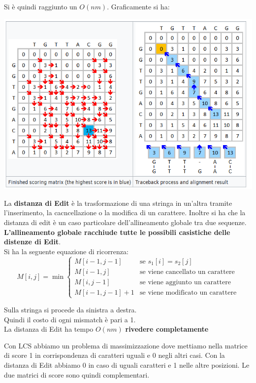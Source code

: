 \documentclass[a4paper,12pt, oneside]{book}
\begin{document}
Si è quindi raggiunto un $O(nm)$.
\newpage
Graficamente si ha:
\begin{center}
  \includegraphics[scale = 0.5]{img/sw.png}
\end{center}
\begin{definizione}
  La \textbf{distanza di Edit} è la trasformazione di una stringa in
  un'altra tramite l'inserimento, la cacncellazione o la modifica di
  un carattere. Inoltre si ha che la distanza di edit è un caso
  particolare dell'allineamento globale tra due sequenze.\\
  \textbf{L'allineamento globale racchiude tutte le possibili
    casistiche delle distenze di Edit}.\\
  Si ha la seguente equazione di ricorrenza:
  \[M[i,j]=\min
    \begin{cases}
      M[i-1,j-1] & \mbox{se } s_1[i]=s_2[j]\\
      M[i-1,j] & \mbox{se viene cancellato un carattere}\\
      M[i,j-1] & \mbox{se viene aggiunto un carattere}\\
      M[i-1,j-1]+1 & \mbox{se viene modificato un carattere}
    \end{cases}
  \]
\end{definizione}
Sulla stringa si procede da sinistra a destra.\\
Quindi il costo di ogni mismatch è pari a 1. \\
La distanza di Edit ha tempo $O(nm)$
\textbf{rivedere completamente}
\begin{shaded}
  Con LCS abbiamo un problema di massimizzazione dove mettiamo nella
  matrice di score 1 in corrispondenza di caratteri uguali e 0 negli
  altri casi. Con la distanza di Edit abbiamo 0 in caso di uguali
  caratteri e 1 nelle altre posizioni. Le due matrici di score sono
  quindi complementari. 
\end{shaded}
\end{document}
